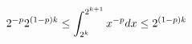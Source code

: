 \documentclass[preview]{standalone}
\begin{document}
\begin{align*}
\special{dvisvgm:raw <g id='unique000'>}2^{-p}2^{(1-p)k}\le\int_{2^k}^{2^{k+1}}x^{-p}dx\le2^{(1-p)k}\special{dvisvgm:raw </g>}
\end{align*}
\end{document}
